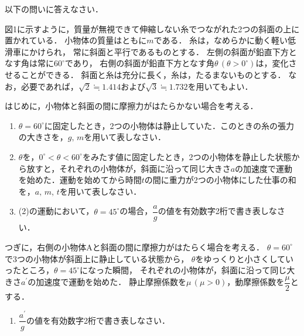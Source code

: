 \setcounter{figure}{0}
以下の問いに答えなさい．

図1に示すように，質量が無視できて伸縮しない糸でつながれた2つの斜面の上に置かれている．
小物体の質量はともに$m$である．
糸は，なめらかに動く軽い低滑車にかけられ，
常に斜面と平行であるものとする．
左側の斜面が鉛直下方となす角は常に$60^\circ$であり，
右側の斜面が鉛直下方となす角$\theta\,(\theta>0^\circ)$は，変化させることができる．
斜面と糸は充分に長く，糸は，たるまないものとする．
なお，必要であれば，$\sqrt{2}\fallingdotseq 1.414$および$\sqrt{3}\fallingdotseq 1.732$を用いてもよい．

はじめに，小物体と斜面の間に摩擦力がはたらかない場合を考える．

\begin{enumerate}[（1）]
  \setlength{\leftskip}{-1.5zw}
  \setlength{\itemindent}{1zw}\setlength{\labelsep}{0.5zw}
  \setlength{\labelwidth}{1zw}\setlength{\leftmargin}{1zw}
  \setlength{\itemsep}{0.5\baselineskip}
  \item $\theta=60^\circ$に固定したとき，2つの小物体は静止していた．このときの糸の張力の大きさを，$g,\,m$を用いて表しなさい．
  \item $\theta$を，$0^\circ<\theta<60^\circ$をみたす値に固定したとき，2つの小物体を静止した状態から放すと，それぞれの小物体が，斜面に沿って同じ大きさ$a$の加速度で運動を始めた．運動を始めてから時間$t$の間に重力が2つの小物体にした仕事の和を，$a,\,m,\,t$を用いて表しなさい．
  \item (2)の運動において，$\theta=45^\circ$の場合，$\dfrac{a}{g}$の値を有効数字2桁で書き表しなさい．
\end{enumerate}

つぎに，右側の小物体Aと斜面の間に摩擦力がはたらく場合を考える．
$\theta=60^\circ$で3つの小物体が斜面上に静止している状態から，
$\theta$をゆっくりと小さくしていったところ，$\theta=45^\circ$になった瞬間，
それぞれの小物体が，斜面に沿って同じ大きさ$a^\prime$の加速度で運動を始めた．
静止摩擦係数を$\mu\,(\mu>0)$，動摩擦係数を$\dfrac{\mu}{2}$とする．

\begin{enumerate}[（1）]
  \setlength{\leftskip}{-1.5zw}
  \setlength{\itemindent}{1zw}\setlength{\labelsep}{0.5zw}
  \setlength{\labelwidth}{1zw}\setlength{\leftmargin}{1zw}
  \setlength{\itemsep}{0.5\baselineskip}
  \addtocounter{enumi}{3}
  \item $\dfrac{a^\prime}{g}$の値を有効数字2桁で書き表しなさい．
\end{enumerate}

